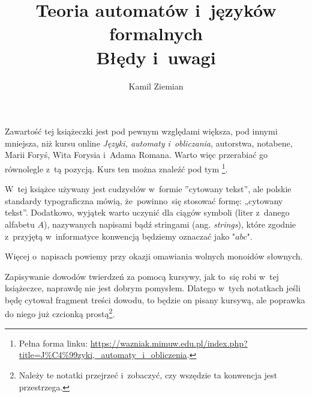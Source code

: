 \documentclass[a4paper,11pt]{article}
\title{Teoria automatów i~języków formalnych \\
  Błędy i~uwagi}
\author{Kamil Ziemian}
\begin{document}





\maketitle %









\start Zawartość tej książeczki jest pod pewnym względami większa, pod
innymi mniejsza, niż kursu online \textit{Języki, automaty
  i~obliczania}, autorstwa, notabene, Marii Foryś, Wita Forysia
i~Adama Romana. Warto więc przerabiać go równolegle z~tą pozycją. Kurs
ten można znaleźć pod tym
\footnote{Pełna
  forma linku:
  \href{https://wazniak.mimuw.edu.pl/index.php?title=J\%C4\%99zyki,\_automaty\_i\_obliczenia}
  {https://wazniak.mimuw.edu.pl/index.php?title=J\%C4\%99zyki,\_automaty\_i\_obliczenia}.}.

\vspace{\spaceFour}





\start W~tej książce używany jest cudzysłów w~formie ”cytowany tekst”,
ale polskie standardy typograficzna mówią, że~powinno~się stosować
formę: „cytowany tekst”. Dodatkowo, wyjątek warto uczynić dla ciągów
symboli (liter z~danego alfabetu $A$), nazywanych napisami bądź
stringami (ang. \textit{strings}), które zgodnie z~przyjętą
w~informatyce konwencją będziemy oznaczać jako
$\texttt{"} abc \texttt{"}$.

Więcej o~napisach powiemy przy okazji omawiania wolnych monoidów
słownych.

\vspace{\spaceFour}





\start Zapisywanie dowodów twierdzeń za pomocą kursywy, jak to~się
robi w~tej książeczce, naprawdę nie jest dobrym pomysłem. Dlatego
w~tych notatkach jeśli będę cytował fragment treści dowodu, to będzie
on pisany kursywą, ale poprawka do niego już czcionką
prostą\footnote{Należy te notatki przejrzeć i~zobaczyć, czy wszędzie
  ta konwencja jest przestrzega.}.
\end{document}
